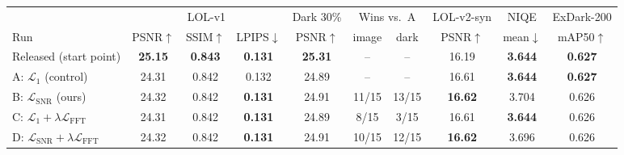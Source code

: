 \begin{tabular}{l ccc c cc c c c}
\toprule
 & \multicolumn{3}{c}{LOL-v1} & Dark 30\% & \multicolumn{2}{c}{Wins vs.\ A} & LOL-v2-syn & NIQE & ExDark-200 \\
\cmidrule(lr){2-4}\cmidrule(lr){6-7}
Run & PSNR$\uparrow$ & SSIM$\uparrow$ & LPIPS$\downarrow$ & PSNR$\uparrow$ & image & dark & PSNR$\uparrow$ & mean$\downarrow$ & mAP50$\uparrow$ \\
\midrule
Released (start point) & \textbf{25.15} & \textbf{0.843} & \textbf{0.131} & \textbf{25.31} & -- & -- & 16.19 & \textbf{3.644} & \textbf{0.627} \\
\midrule
A: $\mathcal{L}_1$ (control) & 24.31 & 0.842 & 0.132 & 24.89 & -- & -- & 16.61 & \textbf{3.644} & \textbf{0.627} \\
B: $\mathcal{L}_{\mathrm{SNR}}$ (ours) & 24.32 & 0.842 & \textbf{0.131} & 24.91 & 11/15 & 13/15 & \textbf{16.62} & 3.704 & 0.626 \\
C: $\mathcal{L}_1{+}\lambda\mathcal{L}_{\mathrm{FFT}}$ & 24.31 & 0.842 & \textbf{0.131} & 24.89 & 8/15 & 3/15 & 16.61 & \textbf{3.644} & 0.626 \\
D: $\mathcal{L}_{\mathrm{SNR}}{+}\lambda\mathcal{L}_{\mathrm{FFT}}$ & 24.32 & 0.842 & \textbf{0.131} & 24.91 & 10/15 & 12/15 & \textbf{16.62} & 3.696 & 0.626 \\
\bottomrule
\end{tabular}
